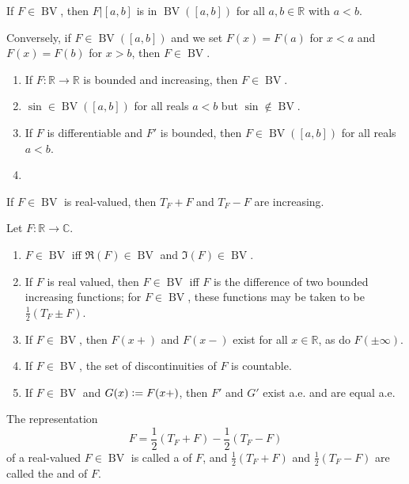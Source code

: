 \documentclass[12pt]{article}	%
\DeclareMathOperator{\BV}{BV}
\begin{document}
\begin{rem}
	If $F \in \BV$, then $F|[a, b]$ is in $\BV([a, b])$ for all $a, b \in \mathbb{R}$ with $a < b$.

	Conversely, if $F \in \BV([a, b])$ and we set $F(x) = F(a)$ for $x < a$ and $F(x) = F(b)$ for $x > b$, then $F \in \BV$.
\end{rem}
\begin{ex}
	\begin{enumerate}
		\item If $F : \mathbb{R} \to \mathbb{R}$ is bounded and increasing, then $F \in \BV$.
		\item $\sin \in \BV([a, b])$ for all reals $a < b$ but $\sin \notin \BV$.
		\item If $F$ is differentiable and $F'$ is bounded, then $F \in \BV([a, b])$ for all reals $a < b$.
		\item 
	\end{enumerate}
\end{ex}

\begin{prop}
	If $F \in \BV$ is real-valued, then $T_{F} + F$ and $T_{F} - F$ are increasing.
\end{prop}

\begin{thm}
	Let $F : \mathbb{R} \to \mathbb{C}$.
	\begin{enumerate}
		\item $F \in \BV$ iff $\Re(F) \in \BV$ and $\Im(F) \in \BV$.
		\item If $F$ is real valued, then $F \in \BV$ iff $F$ is the difference of two bounded increasing functions; for $F \in \BV$, these functions may be taken to be $\frac{1}{2}(T_{F} \pm F)$.
		\item If $F \in \BV$, then $F(x+)$ and $F(x-)$ exist for all $x \in \mathbb{R}$, as do $F(\pm \infty)$.
		\item If $F \in \BV$, the set of discontinuities of $F$ is countable.
		\item If $F \in \BV$ and $G(x) \vcentcolon= F(x+)$, then $F'$ and $G'$ exist a.e. and are equal a.e.
	\end{enumerate}
\end{thm}

The representation
\begin{equation*} 
	F = \frac{1}{2}(T_{F} + F) - \frac{1}{2}(T_{F} - F)
\end{equation*}
of a real-valued $F \in \BV$ is called a  of $F$, and $\frac{1}{2}(T_{F} + F)$ and $\frac{1}{2}(T_{F} - F)$ are called the  and  of $F$. 
\end{document}
